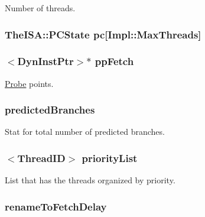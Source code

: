 Number of threads. \hypertarget{classDefaultFetch_a6e6091c9272a281b8693c0f46279cad0}{
\subsubsection[{pc}]{\setlength{\rightskip}{0pt plus 5cm}TheISA::PCState {\bf pc}\mbox{[}Impl::MaxThreads\mbox{]}}}
\label{classDefaultFetch_a6e6091c9272a281b8693c0f46279cad0}
\hypertarget{classDefaultFetch_a853ac5048dfdbba414f6f8186dd11afd}{
\subsubsection[{ppFetch}]{$<${\bf DynInstPtr}$>$$\ast$ {\bf ppFetch}}}
\label{classDefaultFetch_a853ac5048dfdbba414f6f8186dd11afd}
\hyperlink{namespaceProbe}{Probe} points. \hypertarget{classDefaultFetch_ae5c954036e76b5cc5a82cf7f17d4d5ed}{
\subsubsection[{predictedBranches}]{ {\bf predictedBranches}}}
\label{classDefaultFetch_ae5c954036e76b5cc5a82cf7f17d4d5ed}
Stat for total number of predicted branches. \hypertarget{classDefaultFetch_a0d967261cbbce522509d85936b8ce786}{
\subsubsection[{priorityList}]{$<${\bf ThreadID}$>$ {\bf priorityList}}}
\label{classDefaultFetch_a0d967261cbbce522509d85936b8ce786}
List that has the threads organized by priority. \hypertarget{classDefaultFetch_ae97f1fdea38bf1719a7d45a15f3dcd5c}{
\subsubsection[{renameToFetchDelay}]{ {\bf renameToFetchDelay}}}

